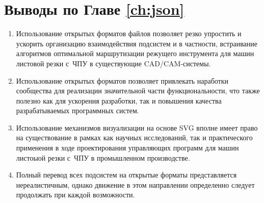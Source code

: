 
\section{Выводы по Главе \ref{ch:json}}
\label{sec:json.conclude}

\begin{enumerate}
  \item
  Использование открытых форматов файлов
  позволяет резко упростить и ускорить
  организацию взаимодействия подсистем
  и в частности,
  встраивание алгоритмов оптимальной маршрутизации
  режущего инструмента для машин листовой
  резки с~ЧПУ в существующие
  CAD/CAM-системы.
  \item
  Использование открытых форматов
  позволяет привлекать наработки
  сообщества для реализации
  значительной части функциональности,
  что также полезно как для ускорения
  разработки,
  так и повышения качества разрабатываемых
  программных систем.
  \item
  Использование механизмов визуализации
  на основе SVG вполне имеет право на существование
  в рамках как научных исследований,
  так и практического применения
  в ходе проектирования управляющих программ
  для машин листоыой
  резки с~ЧПУ
  в промышленном производстве.
  \item
  Полный перевод всех подсистем на открытые
  форматы представляется нереалистичным,
  однако движение в этом направлении
  определенно следует продолжать
  при каждой возможности.
\end{enumerate}
